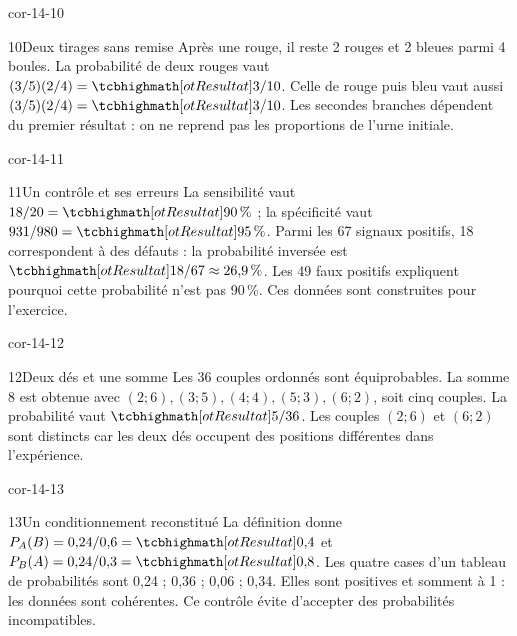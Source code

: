\begin{blocLivre}{cor-14-10}
\begin{corrige}{10}{Deux tirages sans remise}
Après une rouge, il reste 2 rouges et 2 bleues parmi 4 boules. La probabilité de deux rouges vaut $(3/5)(2/4)=\res{3/10}$. Celle de rouge puis bleu vaut aussi $(3/5)(2/4)=\res{3/10}$. Les secondes branches dépendent du premier résultat : on ne reprend pas les proportions de l’urne initiale.
\label{fig-cor-14-10}
\end{corrige}
\end{blocLivre}
\begin{blocLivre}{cor-14-11}
\begin{corrige}{11}{Un contrôle et ses erreurs}
La sensibilité vaut $18/20=\res{90\,\%}$ ; la spécificité vaut $931/980=\res{95\,\%}$. Parmi les 67 signaux positifs, 18 correspondent à des défauts : la probabilité inversée est $\res{18/67\approx26{,}9\,\%}$. Les 49 faux positifs expliquent pourquoi cette probabilité n’est pas 90\,\%. Ces données sont construites pour l’exercice.
\end{corrige}
\end{blocLivre}
\begin{blocLivre}{cor-14-12}
\begin{corrige}{12}{Deux dés et une somme}
Les 36 couples ordonnés sont équiprobables. La somme 8 est obtenue avec $(2;6),(3;5),(4;4),(5;3),(6;2)$, soit cinq couples. La probabilité vaut $\res{5/36}$. Les couples $(2;6)$ et $(6;2)$ sont distincts car les deux dés occupent des positions différentes dans l’expérience.
\label{fig-cor-14-12}
\end{corrige}
\end{blocLivre}
\begin{blocLivre}{cor-14-13}
\begin{corrige}{13}{Un conditionnement reconstitué}
La définition donne $P_A(B)=0{,}24/0{,}6=\res{0{,}4}$ et $P_B(A)=0{,}24/0{,}3=\res{0{,}8}$. Les quatre cases d’un tableau de probabilités sont 0,24 ; 0,36 ; 0,06 ; 0,34. Elles sont positives et somment à 1 : les données sont cohérentes. Ce contrôle évite d’accepter des probabilités incompatibles.
\end{corrige}
\end{blocLivre}
